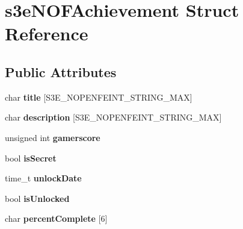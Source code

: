 \hypertarget{structs3e_n_o_f_achievement}{
\section{s3eNOFAchievement Struct Reference}
\label{structs3e_n_o_f_achievement}
}
\subsection*{Public Attributes}
\begin{DoxyCompactItemize}
\item 
\hypertarget{structs3e_n_o_f_achievement_acebe7f3b0ec280affe16115b909aa9b1}{
char {\bfseries title} \mbox{[}S3E\_\-NOPENFEINT\_\-STRING\_\-MAX\mbox{]}}
\label{structs3e_n_o_f_achievement_acebe7f3b0ec280affe16115b909aa9b1}

\item 
\hypertarget{group___n_open_feint_api_group_ga235b598efac1fa1ac756a36ba9ba5164}{
char {\bfseries description} \mbox{[}S3E\_\-NOPENFEINT\_\-STRING\_\-MAX\mbox{]}}
\label{group___n_open_feint_api_group_ga235b598efac1fa1ac756a36ba9ba5164}

\item 
\hypertarget{group___n_open_feint_api_group_ga36870064effddc6b2ff169dccd47c107}{
unsigned int {\bfseries gamerscore}}
\label{group___n_open_feint_api_group_ga36870064effddc6b2ff169dccd47c107}

\item 
\hypertarget{group___n_open_feint_api_group_gabcaf8a16c837646fd6f9da16cfcefc84}{
bool {\bfseries isSecret}}
\label{group___n_open_feint_api_group_gabcaf8a16c837646fd6f9da16cfcefc84}

\item 
\hypertarget{group___n_open_feint_api_group_gacc567fef5f47b21d3b268f9e8146d519}{
time\_\-t {\bfseries unlockDate}}
\label{group___n_open_feint_api_group_gacc567fef5f47b21d3b268f9e8146d519}

\item 
\hypertarget{group___n_open_feint_api_group_gaf6820f91c7ca33cae0a1fc72ce166fd2}{
bool {\bfseries isUnlocked}}
\label{group___n_open_feint_api_group_gaf6820f91c7ca33cae0a1fc72ce166fd2}

\item 
\hypertarget{group___n_open_feint_api_group_gad499493f971fe5430d6a06b5c70ba9d4}{
char {\bfseries percentComplete} \mbox{[}6\mbox{]}}
\label{group___n_open_feint_api_group_gad499493f971fe5430d6a06b5c70ba9d4}


\end{DoxyCompactItemize}
